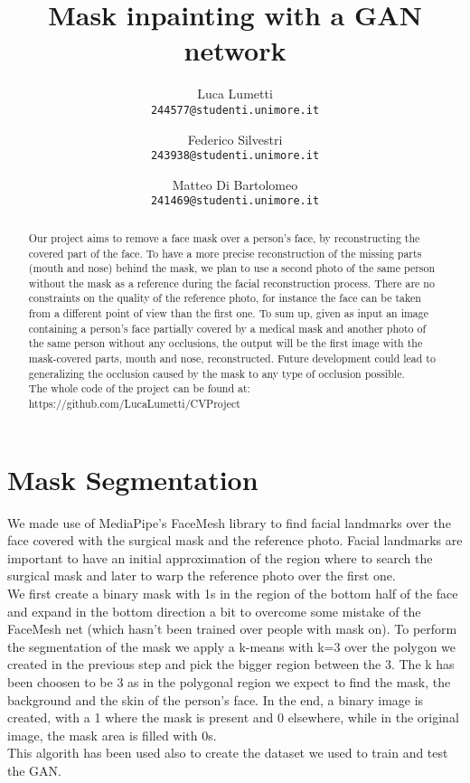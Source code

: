 \documentclass[10pt,twocolumn,letterpaper]{article}
\begin{document}
	\title{Mask inpainting with a GAN network}

	\author{Luca Lumetti\\
		{\tt\small 244577@studenti.unimore.it}
		\and
		Federico Silvestri\\
		{\tt\small 243938@studenti.unimore.it}
		\and
		Matteo Di Bartolomeo\\
		{\tt\small 241469@studenti.unimore.it}
	}

	\maketitle

	\begin{abstract}
    Our project aims to remove a face mask over a person’s face, by
    reconstructing the covered part of the face. To have a more precise
    reconstruction of the missing parts (mouth and nose) behind the mask, we
    plan to use a second photo of the same person without the mask as a
    reference during the facial reconstruction process. There are no constraints
    on the quality of the reference photo, for instance the face can be taken
    from a different point of view than the first one. To sum up, given as input
    an image containing a person’s face partially covered by a medical mask and
    another photo of the same person without any occlusions, the output will be
    the first image with the mask-covered parts, mouth and nose, reconstructed.
    Future development could lead to generalizing the occlusion caused by the
    mask to any type of occlusion possible.\\
    The whole code of the project can be found at:
    https://github.com/LucaLumetti/CVProject
	\end{abstract}

	\section{Mask Segmentation}
  We made use of MediaPipe's FaceMesh \cite{DBLP:journals/corr/abs-1907-06724}
  library to find facial landmarks over the face covered with the surgical mask
  and the reference photo. Facial landmarks are important to have an initial
  approximation of the region where to search the surgical mask and later to warp the
  reference photo over the first one.\\
  We first create a binary mask with 1s in the region of the bottom half of the
  face and expand in the bottom direction a bit to overcome some mistake of the
  FaceMesh net (which hasn't been trained over people with mask on).
  To perform the segmentation of the mask we apply a k-means with k=3 over the
  polygon we created in the previous step and
  pick the bigger region between the 3.  The k has been choosen to be 3 as in
  the polygonal region we expect to find the mask, the background and the skin
  of the person's face. In the end, a binary image is created, with a 1 where
  the mask is present and 0 elsewhere, while in the original image, the mask
  area is filled with 0s.\\
  This algorith has been used also to create the dataset we used to train and
  test the GAN.
\end{document}
